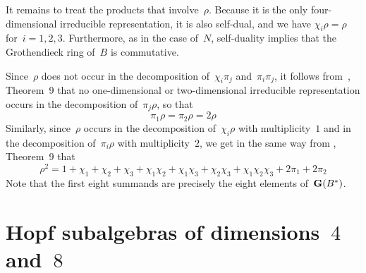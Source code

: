 \documentclass{article}
\numberwithin{equation}{section}
\theoremstyle{definition}
\theoremstyle{break}
\newcommand{\1}{{(1)}}
\newcommand{\2}{{(2)}}
\newcommand{\3}{{(3)}}
\begin{document}
It remains to treat the products that involve~$\rho$. Because it is the only four-dimensional irreducible representation, it is also self-dual, and we have \mbox{$\chi_i \rho = \rho$}
for~$i=1, 2, 3$. Furthermore, as in the case of~$N$, self-duality implies that the Grothendieck ring of~$B$ is commutative.

Since~$\rho$ does not occur in the decomposition of~$\chi_i \pi_j$ and~$\pi_i \pi_j$, it follows from~\cite{NR}, Theorem~9 that no one-dimensional or two-dimensional irreducible representation  occurs in the decomposition of~$\pi_j \rho$, so that
\[\pi_1 \rho = \pi_2 \rho = 2 \rho\]
Similarly, since~$\rho$ occurs in the decomposition of~$\chi_i \rho$ with multiplicity~$1$ and in the decomposition of~$\pi_i \rho$ with multiplicity~$2$, we get in the same way from \cite{NR}, Theorem~9 that
\[\rho^2 = 1 + \chi_1 + \chi_2 +\chi_3 + \chi_1 \chi_2 + \chi_1 \chi_3 + \chi_2 \chi_3
+ \chi_1 \chi_2 \chi_3 + 2 \pi_1 +2 \pi_2 \]
Note that the first eight summands are precisely the eight elements of~${\bf G}(B^*)$.


\section{Hopf subalgebras of dimensions~$4$ and~$8$} \label{Sec:4by8}
\end{document}
